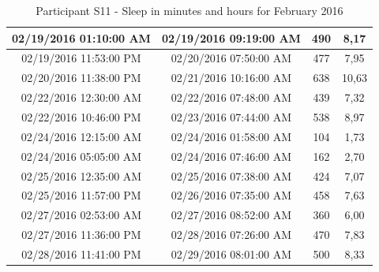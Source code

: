 \documentclass[12pt]{article} %
\begin{document}
\begin{table}[H]
\begin{footnotesize}
\begin{tabular}{| c | c | c | c |}
\hline
02/19/2016 01:10:00 AM & 02/19/2016 09:19:00 AM & 490 &	8,17\\
\hline
02/19/2016 11:53:00 PM & 02/20/2016 07:50:00 AM & 477 &	7,95\\
\hline
\colorbox{blue!30}{02/20/2016 11:38:00 PM} & \colorbox{blue!30}{02/21/2016 10:16:00 AM} & \colorbox{blue!30}{638} & \colorbox{blue!30}{10,63}\\
\hline
02/22/2016 12:30:00 AM & 02/22/2016 07:48:00 AM & 439 &	7,32\\
\hline
02/22/2016 10:46:00 PM & 02/23/2016 07:44:00 AM & 538 &	8,97\\
\hline
02/24/2016 12:15:00 AM & 02/24/2016 01:58:00 AM & 104 &	1,73\\
\hline
02/24/2016 05:05:00 AM & 02/24/2016 07:46:00 AM & 162 &	2,70\\
\hline
02/25/2016 12:35:00 AM & 02/25/2016 07:38:00 AM & 424 &	7,07\\
\hline
02/25/2016 11:57:00 PM & 02/26/2016 07:35:00 AM & 458 &	7,63\\
\hline
\colorbox{blue!20}{02/27/2016 02:53:00 AM} & \colorbox{blue!20}{02/27/2016 08:52:00 AM} & \colorbox{blue!20}{360} & \colorbox{blue!20}{6,00}\\
\hline
\colorbox{blue!20}{02/27/2016 11:36:00 PM} & \colorbox{blue!20}{02/28/2016 07:26:00 AM} & \colorbox{blue!20}{470} & \colorbox{blue!20}{7,83}\\
\hline
\colorbox{blue!30}{02/28/2016 11:41:00 PM} & \colorbox{blue!30}{02/29/2016 08:01:00 AM} & \colorbox{blue!30}{500} & \colorbox{blue!30}{8,33}\\
	\hline
	\end{tabular}
	\caption{Participant S11 - Sleep in minutes and hours for February 2016}
	\label{tab:S11FebPhone}
\end{footnotesize}
\end{table}
\end{document}
